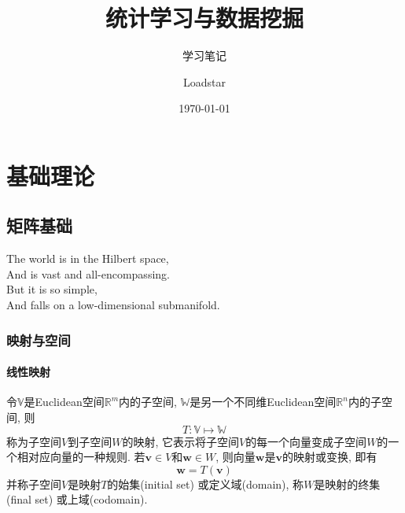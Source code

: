\documentclass[lang=cn,10pt]{gorgeousnbook}
\title{统计学习与数据挖掘}
\subtitle{学习笔记}
\author{Loadstar}
\institute{Elegant\LaTeX{} Program}
\date{\today}
\numberwithin{equation}{section}%
\numberwithin{figure}{section}%
\begin{document}
\maketitle
%    
\frontmatter
\thispagestyle{fancy}
\tableofcontents

\mainmatter
{}
\part{基础理论}
%
\chapter{矩阵基础}
\begin{center}
    The world is in the Hilbert space,\\
	And is vast and all-encompassing.\\
	But it is so simple,\\
	And falls on a low-dimensional submanifold.
\end{center}

\vspace{-5pt}
\begin{center}
\end{center}
\section{映射与空间}
\subsection{线性映射}
令$\mathbb{V}$是Euclidean空间$\mathbb{R}^m$内的子空间, $\mathbb{W}$是另一个不同维Euclidean空间$\mathbb{R}^n$内的子空间, 则
\begin{equation}
T: \mathbb{V}\mapsto \mathbb{W}
\end{equation}
称为子空间$V$到子空间$W$的映射, 它表示将子空间$V$的每一个向量变成子空间$W$的一个相对应向量的一种规则. 若$\boldsymbol{v}\in V$和$\boldsymbol{w}\in W$, 则向量$\boldsymbol{w}$是$\boldsymbol{v}$的映射或变换, 即有
\begin{equation}
\boldsymbol{w}=T\left(\boldsymbol{v}\right)
\end{equation}
并称子空间$V$是映射$T$的始集(initial set) 或定义域(domain), 称$W$是映射的终集(final set) 或上域(codomain).
\end{document}
